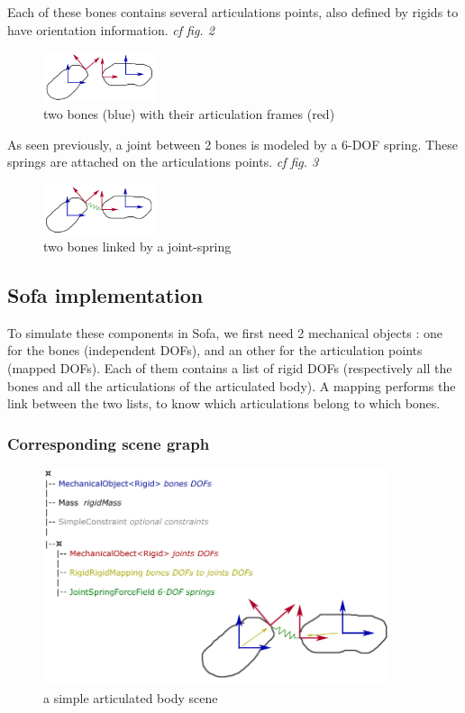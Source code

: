 Each of these bones contains several articulations points, also defined by rigids to have orientation information. \textsl{cf fig. 2}
\begin{figure}[htpb]
	\centering
		\includegraphics[width=0.30\textwidth]{softArt_G2.png}
	\caption{two bones (blue) with their articulation frames (red)}
\end{figure}

As seen previously, a joint between 2 bones is modeled by a 6-DOF spring. These springs are attached on the articulations points.    \textsl{cf fig. 3}
\begin{figure}[htpb]
	\centering
		\includegraphics[width=0.30\textwidth]{softArt_G3.png}
	\caption{two bones linked by a joint-spring}
\end{figure}



\subsection{Sofa implementation}

To simulate these components in Sofa, we first need 2 mechanical objects : one for the bones (independent DOFs), and an other for the articulation points (mapped DOFs).
Each of them contains a list of rigid DOFs (respectively all the bones and all the articulations of the articulated body).
A mapping performs the link between the two lists, to know which articulations belong to which bones.


\subsubsection{Corresponding scene graph}
\begin{figure}[htpb]
	\centering
		\includegraphics[width=0.90\textwidth]{scene_graph.png}
	\caption{a simple articulated body scene}
\end{figure}

